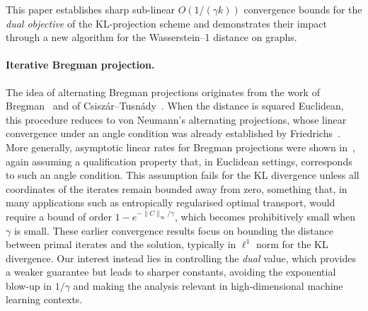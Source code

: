 \documentclass{article}
\theoremstyle{plain}
\newcommand{\norm}[1]{\|#1\|}
\begin{document}
This paper establishes sharp sub-linear $O(1/(\gamma k))$ convergence bounds for the \emph{dual objective} of the KL-projection scheme and demonstrates their impact through a new algorithm for the Wasserstein--1 distance on graphs.

\paragraph{Iterative Bregman projection.}
The idea of alternating Bregman projections originates from the work of Bregman~\citep{Bregman67} and of Csiszár--Tusnády~\citep{CsiszarTusnady84}. When the distance is squared Euclidean, this procedure reduces to von Neumann's alternating projections, whose linear convergence under an angle condition was already established by Friedrichs~\citep{Friedrichs38}. More generally, asymptotic linear rates for Bregman projections were shown in~\citep{CensorRezac15}, again assuming a qualification property that, in Euclidean settings, corresponds to such an angle condition. This assumption fails for the KL divergence unless all coordinates of the iterates remain bounded away from zero, something that, in many applications such as entropically regularised optimal transport, would require a bound of order $1-e^{-\norm{C}_\infty/\gamma}$, which becomes prohibitively small when $\gamma$ is small. These earlier convergence results focus on bounding the distance between primal iterates and the solution, typically in $\ell^1$ norm for the KL divergence. Our interest instead lies in controlling the \emph{dual} value, which provides a weaker guarantee but leads to sharper constants, avoiding the exponential blow-up in $1/\gamma$ and making the analysis relevant in high-dimensional machine learning contexts.
\end{document}
